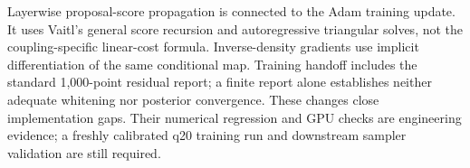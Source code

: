 Layerwise proposal-score propagation is connected to the Adam training
update. It uses Vaitl's general score recursion and autoregressive triangular
solves, not the coupling-specific linear-cost formula. Inverse-density
gradients use implicit differentiation of the same conditional map.
Training handoff includes the standard 1,000-point residual report; a finite
report alone establishes neither adequate whitening nor posterior convergence.
These changes close implementation gaps. Their numerical regression and
GPU checks are engineering evidence; a freshly calibrated q20 training run
and downstream sampler validation are still required.
